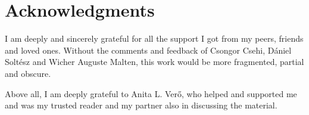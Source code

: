 \documentclass{article}
\theoremstyle{definition}
\begin{document}
\section{Acknowledgments}

I am deeply and sincerely grateful for all the support I got from my peers, friends and loved ones. Without the comments and feedback of Csongor Csehi, Dániel Soltész and Wicher Auguste Malten, this work would be more fragmented, partial and obscure.

Above all, I am deeply grateful to Anita L. Verő, who helped and supported me and was my trusted reader and my partner also in discussing the material.



\newpage






%

%

\end{document}
